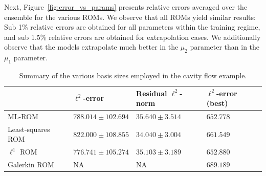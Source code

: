 \documentclass[3p,computermodern,10pt]{elsarticle}
\begin{document}
Next, Figure~\ref{fig:error_vs_params} presents relative errors averaged over the ensemble for the various ROMs. We observe that all ROMs yield similar results: Sub 1\% relative errors are obtained for all parameters within the training regime, and sub 1.5\% relative errors are obtained for extrapolation cases. We additionally observe that the models extrapolate much better in the $\mu_2$ parameter than in the $\mu_1$ parameter. 
\begin{table}[]
\begin{centering}
\begin{tabular}{l l l l}
\hline
  & $\ell^2$-error  & Residual $\ell^2$-norm & $\ell^2$-error (best) \\
\hline
ML-ROM    & $788.014 \pm 102.694 $ & $35.640 \pm 3.514$  &  $652.778 $ \\
Least-squares ROM & $822.000 \pm 108.855$ & $34.040 \pm 3.004$ & $661.549$\\
$\ell^1$ ROM    & $776.741 \pm 105.274$ &  $35.103 \pm  3.189$ & $652.880$\\
Galerkin ROM    & NA &  NA & $689.189$  \\
\hline
\end{tabular}
\caption{Summary of the various basis sizes employed in the cavity flow example.}
\label{tab:burg_results}
\end{centering}
\end{table}
\end{document}
